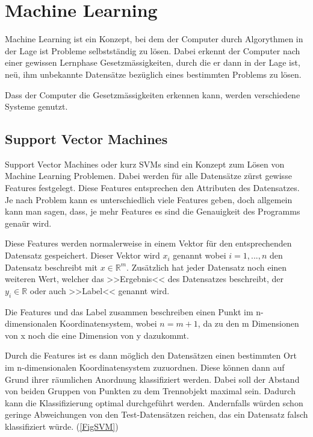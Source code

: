\newcommand{\norm}[1]{\left\lVert#1\right\rVert}

\section{Machine Learning}
\author{Farhadiba Mohammed, Dennis Kempf, David Steinmann}
Machine Learning ist ein Konzept, bei dem der Computer durch Algorythmen in der Lage ist Probleme selbstständig zu lösen. Dabei erkennt der Computer nach einer gewissen Lernphase Gesetzmässigkeiten, durch die er dann in der Lage ist, neü, ihm unbekannte Datensätze bezüglich eines bestimmten Problems zu lösen.

Dass der Computer die Gesetzmässigkeiten erkennen kann, werden verschiedene Systeme genutzt.

\subsection{Support Vector Machines}
\author{David Steinmann}
Support Vector Machines oder kurz SVMs sind ein Konzept zum Lösen von Machine Learning Problemen.
Dabei werden für alle Datensätze zürst gewisse Features festgelegt. Diese Features entsprechen den Attributen des Datensatzes. Je nach Problem kann es unterschiedlich viele Features geben, doch allgemein kann man sagen, dass, je mehr Features es sind die Genauigkeit des Programms genaür wird.

Diese Features werden normalerweise in einem Vektor für den entsprechenden Datensatz gespeichert.
Dieser Vektor wird $x_{i}$ genannt wobei $i = 1, ..., n$ den Datensatz beschreibt mit  $x \in  \mathbb{R}^m$.
Zusätzlich hat jeder Datensatz noch einen weiteren Wert, welcher das >>Ergebnis<< des Datensatzes beschreibt, der $y_{i} \in \mathbb{R}$ oder auch >>Label<< genannt wird.

Die Features und das Label zusammen beschreiben einen Punkt im n-dimensionalen Koordinatensystem, wobei $n = m + 1$, da zu den m Dimensionen von x noch die eine Dimension von y dazukommt.

Durch die Features ist es dann möglich den Datensätzen einen bestimmten Ort im n-dimensionalen Koordinatensystem zuzuordnen. Diese können dann auf Grund ihrer räumlichen Anordnung klassifiziert werden. Dabei soll der Abstand von beiden Gruppen von Punkten zu dem Trennobjekt maximal sein. Dadurch kann die Klassifizierung optimal durchgeführt werden. Andernfalls würden schon geringe Abweichungen von den Test-Datensätzen reichen, das ein Datensatz falsch klassifiziert würde. (\ref{FigSVM})

